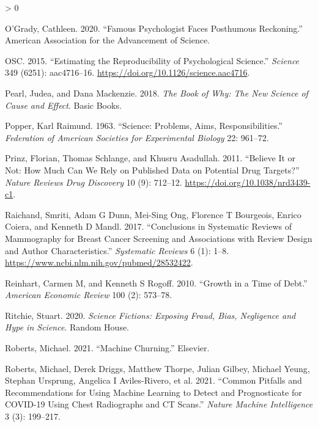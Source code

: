 \documentclass[
  10pt,
  b5paper]{book}
\newlength{\cslhangindent}
\newenvironment{CSLReferences}[2] %
 {%
  \setlength{\parindent}{0pt}
  \ifodd #1 \everypar{\setlength{\hangindent}{\cslhangindent}}\ignorespaces\fi
  \ifnum #2 > 0
  \setlength{\parskip}{#2\baselineskip}
  \fi
 }%
 {}
\begin{document}
\begin{CSLReferences}{1}{0}
\leavevmode\hypertarget{ref-o2020famous}{}%
O'Grady, Cathleen. 2020. {``Famous Psychologist Faces Posthumous Reckoning.''} American Association for the Advancement of Science.

\leavevmode\hypertarget{ref-r1_osc_EstRep2015}{}%
OSC. 2015. {``Estimating the Reproducibility of Psychological Science.''} \emph{Science} 349 (6251): aac4716--16. \url{https://doi.org/10.1126/science.aac4716}.

\leavevmode\hypertarget{ref-pearl2018book}{}%
Pearl, Judea, and Dana Mackenzie. 2018. \emph{The Book of Why: The New Science of Cause and Effect}. Basic Books.

\leavevmode\hypertarget{ref-popper_1963}{}%
Popper, Karl Raimund. 1963. {``Science: Problems, Aims, Responsibilities.''} \emph{Federation of American Societies for Experimental Biology} 22: 961--72.

\leavevmode\hypertarget{ref-r9_prinz_schlange_asadullah_2011}{}%
Prinz, Florian, Thomas Schlange, and Khusru Asadullah. 2011. {``Believe It or Not: How Much Can We Rely on Published Data on Potential Drug Targets?''} \emph{Nature Reviews Drug Discovery} 10 (9): 712--12. \url{https://doi.org/10.1038/nrd3439-c1}.

\leavevmode\hypertarget{ref-raichand2017conclusions}{}%
Raichand, Smriti, Adam G Dunn, Mei-Sing Ong, Florence T Bourgeois, Enrico Coiera, and Kenneth D Mandl. 2017. {``Conclusions in Systematic Reviews of Mammography for Breast Cancer Screening and Associations with Review Design and Author Characteristics.''} \emph{Systematic Reviews} 6 (1): 1--8. \url{https://www.ncbi.nlm.nih.gov/pubmed/28532422}.

\leavevmode\hypertarget{ref-reinhart2010growth}{}%
Reinhart, Carmen M, and Kenneth S Rogoff. 2010. {``Growth in a Time of Debt.''} \emph{American Economic Review} 100 (2): 573--78.

\leavevmode\hypertarget{ref-ritchie2020science}{}%
Ritchie, Stuart. 2020. \emph{Science Fictions: Exposing Fraud, Bias, Negligence and Hype in Science}. Random House.

\leavevmode\hypertarget{ref-roberts2021machine}{}%
Roberts, Michael. 2021. {``Machine Churning.''} Elsevier.

\leavevmode\hypertarget{ref-roberts2021common}{}%
Roberts, Michael, Derek Driggs, Matthew Thorpe, Julian Gilbey, Michael Yeung, Stephan Ursprung, Angelica I Aviles-Rivero, et al. 2021. {``Common Pitfalls and Recommendations for Using Machine Learning to Detect and Prognosticate for COVID-19 Using Chest Radiographs and CT Scans.''} \emph{Nature Machine Intelligence} 3 (3): 199--217.


\end{CSLReferences}
\end{document}
